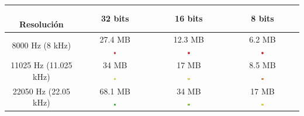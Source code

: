\documentclass[11pt,a4paper]{article}
\begin{document}
\begin{table}[H]
\centering
\begin{tabular}{|c|c|c|c|}
\hline
\diagbox[width=15em]{Frecuencia\\de muestreo}{\\Resolución} & 32 bits & 16 bits & 8 bits  \\ \hline

8000 Hz (8 kHz) & \makecell{27.4 MB\\ \includegraphics[width=0.03\textwidth]{mm.png}} & \makecell{12.3 MB\\ \includegraphics[width=0.03\textwidth]{mm.png}} & \makecell{6.2 MB\\ \includegraphics[width=0.03\textwidth]{mm.png}} \\ \hline

11025 Hz (11.025 kHz) & \makecell{34 MB\\ \includegraphics[width=0.03\textwidth]{r.png}} & \makecell{17 MB\\ \includegraphics[width=0.03\textwidth]{r.png}} & \makecell{8.5 MB\\ \includegraphics[width=0.03\textwidth]{m.png}} \\ \hline

22050 Hz (22.05 kHz) & \makecell{68.1 MB\\ \includegraphics[width=0.03\textwidth]{mb.png}} & \makecell{34 MB\\ \includegraphics[width=0.03\textwidth]{b.png}} & \makecell{17 MB\\ \includegraphics[width=0.03\textwidth]{r.png}} \\ \hline


\end{tabular}
\end{table}
\end{document}

